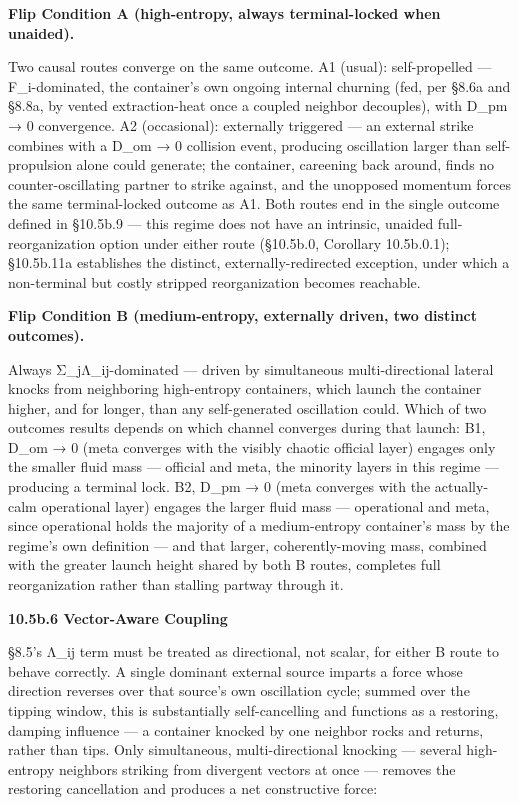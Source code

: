 \documentclass[
]{article}
\begin{document}
\textbf{Flip Condition A (high-entropy, always terminal-locked when
unaided).}

Two causal routes converge on the same outcome. A1 (usual):
self-propelled --- F\_i-dominated, the container's own ongoing internal
churning (fed, per §8.6a and §8.8a, by vented extraction-heat once a
coupled neighbor decouples), with D\_pm → 0 convergence. A2
(occasional): externally triggered --- an external strike combines with
a D\_om → 0 collision event, producing oscillation larger than
self-propulsion alone could generate; the container, careening back
around, finds no counter-oscillating partner to strike against, and the
unopposed momentum forces the same terminal-locked outcome as A1. Both
routes end in the single outcome defined in §10.5b.9 --- this regime
does not have an intrinsic, unaided full-reorganization option under
either route (§10.5b.0, Corollary 10.5b.0.1); §10.5b.11a establishes the
distinct, externally-redirected exception, under which a non-terminal
but costly stripped reorganization becomes reachable.

\textbf{Flip Condition B (medium-entropy, externally driven, two
distinct outcomes).}

Always Σ\_jΛ\_ij-dominated --- driven by simultaneous multi-directional
lateral knocks from neighboring high-entropy containers, which launch
the container higher, and for longer, than any self-generated
oscillation could. Which of two outcomes results depends on which
channel converges during that launch: B1, D\_om → 0 (meta converges with
the visibly chaotic official layer) engages only the smaller fluid mass
--- official and meta, the minority layers in this regime --- producing
a terminal lock. B2, D\_pm → 0 (meta converges with the actually-calm
operational layer) engages the larger fluid mass --- operational and
meta, since operational holds the majority of a medium-entropy
container's mass by the regime's own definition --- and that larger,
coherently-moving mass, combined with the greater launch height shared
by both B routes, completes full reorganization rather than stalling
partway through it.

\textbf{10.5b.6 Vector-Aware Coupling}

§8.5's Λ\_ij term must be treated as directional, not scalar, for either
B route to behave correctly. A single dominant external source imparts a
force whose direction reverses over that source's own oscillation cycle;
summed over the tipping window, this is substantially self-cancelling
and functions as a restoring, damping influence --- a container knocked
by one neighbor rocks and returns, rather than tips. Only simultaneous,
multi-directional knocking --- several high-entropy neighbors striking
from divergent vectors at once --- removes the restoring cancellation
and produces a net constructive force:
\end{document}
